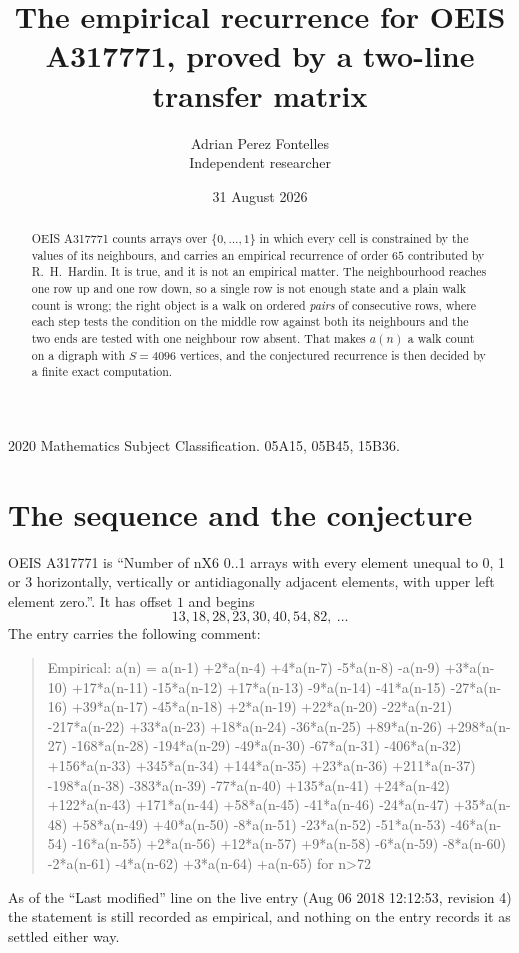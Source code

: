 \documentclass[11pt,a4paper]{article}
\title{The empirical recurrence for OEIS A317771, proved by a two-line transfer matrix}
\author{Adrian Perez Fontelles\\ \small Independent researcher}
\date{31 August 2026}
\theoremstyle{plain}
\theoremstyle{definition}
\begin{document}
\maketitle

\begin{abstract}
OEIS A317771 counts arrays over $\{0,\dots,1\}$ in which every cell is constrained by the
values of its neighbours, and carries an empirical recurrence of order $65$ contributed
by R.~H.~Hardin. It is true, and it is not an empirical matter. The neighbourhood reaches one
row up and one row down, so a single row is not enough state and a plain walk count
is wrong; the right object is a walk on ordered \emph{pairs} of consecutive rows, where
each step tests the condition on the middle row against both its neighbours and the two
ends are tested with one neighbour row absent. That makes $a(n)$ a walk count on a digraph
with $S=4096$ vertices, and the conjectured recurrence is then decided by a finite exact
computation.
\end{abstract}

\noindent\small 2020 Mathematics Subject Classification. 05A15, 05B45, 15B36.\normalsize

\section{The sequence and the conjecture}

OEIS A317771 is ``Number of nX6 0..1 arrays with every element unequal to 0, 1 or 3 horizontally, vertically or antidiagonally adjacent elements, with upper left element zero.''. It has offset $1$ and begins
\[
13, 18, 28, 23, 30, 40, 54, 82,\ \dots
\]
The entry carries the following comment:
\begin{quote}\small
Empirical: a(n) = a(n-1) +2*a(n-4) +4*a(n-7) -5*a(n-8) -a(n-9) +3*a(n-10) +17*a(n-11) -15*a(n-12) +17*a(n-13) -9*a(n-14) -41*a(n-15) -27*a(n-16) +39*a(n-17) -45*a(n-18) +2*a(n-19) +22*a(n-20) -22*a(n-21) -217*a(n-22) +33*a(n-23) +18*a(n-24) -36*a(n-25) +89*a(n-26) +298*a(n-27) -168*a(n-28) -194*a(n-29) -49*a(n-30) -67*a(n-31) -406*a(n-32) +156*a(n-33) +345*a(n-34) +144*a(n-35) +23*a(n-36) +211*a(n-37) -198*a(n-38) -383*a(n-39) -77*a(n-40) +135*a(n-41) +24*a(n-42) +122*a(n-43) +171*a(n-44) +58*a(n-45) -41*a(n-46) -24*a(n-47) +35*a(n-48) +58*a(n-49) +40*a(n-50) -8*a(n-51) -23*a(n-52) -51*a(n-53) -46*a(n-54) -16*a(n-55) +2*a(n-56) +12*a(n-57) +9*a(n-58) -6*a(n-59) -8*a(n-60) -2*a(n-61) -4*a(n-62) +3*a(n-64) +a(n-65) for n>72
\end{quote}
As of the ``Last modified'' line on the live entry (Aug 06 2018 12:12:53, revision 4) the statement is
still recorded as empirical, and nothing on the entry records it as settled either way.
\end{document}
